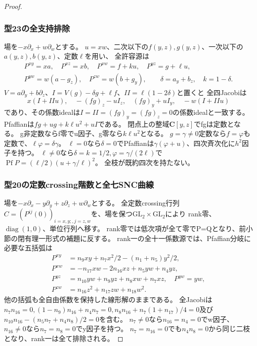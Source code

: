 \documentclass[a4paper,11pt]{ltjsarticle}
\theoremstyle{definition}
\newcommand{\CC}{\mathbf C}
\begin{document}
\begin{proof}
\subsubsection*{型23の全支持排除}
場を$-x\partial_x+w\partial_w$とする。
$u=xw$、二次以下の$f(y,z),g(y,z)$、一次以下の$a(y,z),b(y,z)$、定数$\ell$を用い、
全許容源は
\[
\begin{gathered}
 P^{xy}=xa,\quad P^{xz}=xb,\quad P^{xw}=f+ku,\quad P^{yz}=g+\ell u,\\
 P^{yw}=w(a-g_z),\quad P^{zw}=w(b+g_y),\qquad
 \delta=a_y+b_z,\quad k=1-\delta.
\end{gathered}
\]
$V=a\partial_y+b\partial_z$、$I=V(g)-\delta g+\ell f$、$II=\ell(1-2\delta)$と置くと
全四Jacobiは
\[
 x(I+IIu),\quad -(fg)_z-uI_z,\quad (fg)_y+uI_y,\quad -w(I+IIu)
\]
であり、その係数idealは$I=II=(fg)_y=(fg)_z=0$の係数idealと一致する。
Pfaffianは$fg+ug+k\ell u^2+uI$である。
閉点上の整域$\CC[y,z]$でfgは定数となる。
g非定数ならf零でu因子、g零なら$k\ell u^2$となる。
$g=\gamma\ne0$定数なら$f=\varphi$も定数で、$\ell\varphi=\delta\gamma$。
$\ell=0$なら$\delta=0$でPfaffianは$\gamma(\varphi+u)$、四次斉次化に$h^2$因子を持つ。
$\ell\ne0$なら$\delta=k=1/2,\varphi=\gamma/(2\ell)$で
$\operatorname{Pf}P=(\ell/2)(u+\gamma/\ell)^2$。
全枝が既約四次を持たない。

\subsubsection*{型20の定数crossing階数と全七SNC曲線}
場を$-x\partial_x-y\partial_y+z\partial_z+w\partial_w$とする。
全定数crossing行列$C=(P^{ij}(0))_{i=x,y;,j=z,w}$を、場を保つ$\mathrm{GL}_2\times\mathrm{GL}_2$により
rank零、$\operatorname{diag}(1,0)$、単位行列へ移す。
rank零では低次項が全て零でP=Qとなり、前小節の閉有理一形式の補題に反する。
rank一の全十一係数源では、Pfaffian分岐に必要な五括弧は
\[
\begin{aligned}
 P^{xy}&=n_9xy+n_7x^2/2-(n_1+n_5)y^2/2,\\
 P^{xw}&=-n_{17}xw-2n_{16}xz+n_5yw+n_4yz,\\
 P^{yz}&=n_{10}yw+n_9yz+n_8xw+n_7xz,\quad P^{yw}=yw,\\
 P^{zw}&=n_{16}z^2+n_{17}zw+n_{18}w^2.
\end{aligned}
\]
他の括弧も全自由係数を保持した線形解のままである。
全Jacobiは$n_7n_{16}=0,(1-n_9)n_{16}+n_4n_7=0,
 n_8n_{16}+n_7(1+n_{17})/4=0$及び
$n_{10}n_{16}-(n_5n_7+n_4n_8)/2=0$を含む。
$n_7\ne0$なら$n_{16}=n_4=0$でw因子、
$n_{16}\ne0$なら$n_7=n_8=0$でy因子を持つ。
$n_7=n_{16}=0$でも$n_4n_8=0$から同じ二枝となり、rank一は全て排除される。


\end{proof}
\end{document}
